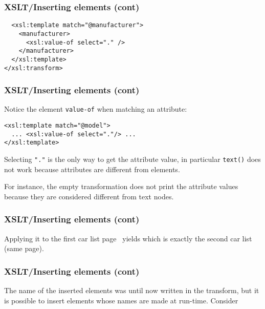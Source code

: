 %
\begin{frame}[containsverbatim]
\frametitle{XSLT/Inserting elements (cont)}

{\small
\begin{verbatim}
  <xsl:template match="@manufacturer">
    <manufacturer>
      <xsl:value-of select="." />
    </manufacturer>
  </xsl:template>
</xsl:transform>
\end{verbatim}
}

\end{frame}

%
\begin{frame}[containsverbatim]
\frametitle{XSLT/Inserting elements (cont)}

Notice the \XSLT element \texttt{value-of} when matching an
attribute:
{\small
\begin{verbatim}
<xsl:template match="@model">
  ... <xsl:value-of select="."/> ...
</xsl:template>
\end{verbatim}
} 
Selecting \verb|"."| is the only way to get the attribute value, in
particular \verb|text()| does not work because attributes are
different from elements. 

\bigskip

For instance, the empty transformation does not print the attribute
values because they are considered different from text nodes.
 
\end{frame}

%
\begin{frame}
\frametitle{XSLT/Inserting elements (cont)}

Applying it to the first car list page~\pageref{cars} yields
 which is exactly the second car
list (same page).

\end{frame}

%
\begin{frame}
\frametitle{XSLT/Inserting elements (cont)}

The name of the inserted elements was until now written in the
transform, but it is possible to insert elements whose names are made
at run-time. Consider

\end{frame}

